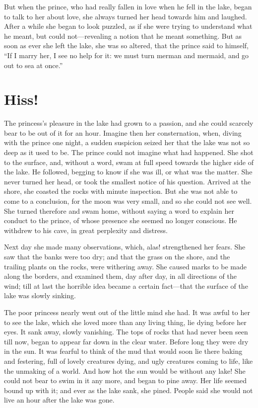 \documentclass[12pt]{memoir}
\begin{document}
But when the prince, who had really fallen in love when he fell in the
lake, began to talk to her about love, she always turned her head
towards him and laughed.  After a while she began to look puzzled, as
if she were trying to understand what he meant, but could
not---revealing a notion that he meant something.  But as soon as ever
she left the lake, she was so altered, that the prince said to
himself, ``If I marry her, I see no help for it: we must turn merman
and mermaid, and go out to sea at once.''



\chapter{Hiss!}


The princess's pleasure in the lake had grown to a passion, and she
could scarcely bear to be out of it for an hour.  Imagine then her
consternation, when, diving with the prince one night, a sudden
suspicion seized her that the lake was not so deep as it used to
be.  The prince could not imagine what had happened.  She shot to the
surface, and, without a word, swam at full speed towards the higher
side of the lake.  He followed, begging to know if she was ill, or
what was the matter.  She never turned her head, or took the
smallest notice of his question.  Arrived at the shore, she coasted
the rocks with minute inspection.  But she was not able to come to
a conclusion, for the moon was very small, and so she could not see
well.  She turned therefore and swam home, without saying a word to
explain her conduct to the prince, of whose presence she seemed no
longer conscious.  He withdrew to his cave, in great perplexity and
distress.

\enlargethispage{\baselineskip}
Next day she made many observations, which, alas! strengthened her
fears.  She saw that the banks were too dry; and that the grass on the
shore, and the trailing plants on the rocks, were withering away.  She
caused marks to be made along the borders, and examined them, day
after day, in all directions of the wind; till at last the horrible
idea became a certain fact---that the surface of the lake was slowly
sinking.

The poor princess nearly went out of the little mind she had.  It was
awful to her to see the lake, which she loved more than any living
thing, lie dying before her eyes.  It sank away, slowly vanishing.
The tops of rocks that had never been seen till now, began to appear
far down in the clear water.  Before long they were dry in the sun.
It was fearful to think of the mud that would soon lie there baking
and festering, full of lovely creatures dying, and ugly creatures
coming to life, like the unmaking of a world.  And how hot the sun
would be without any lake!  She could not bear to swim in it any more,
and began to pine away.  Her life seemed bound up with it; and ever as
the lake sank, she pined.  People said she would not live an hour
after the lake was gone.
\end{document}
